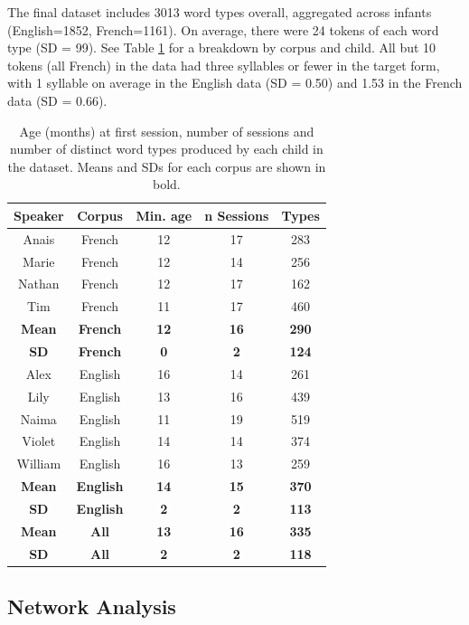 \documentclass[
  man,mask,floatsintext]{apa6}
\begin{document}
The final dataset includes 3013 word types overall, aggregated across infants (English=1852, French=1161). On average, there were 24 tokens of each word type (SD = 99). See Table \ref{tab:table-data-overview} for a breakdown by corpus and child. All but 10 tokens (all French) in the data had three syllables or fewer in the target form, with 1 syllable on average in the English data (SD = 0.50) and 1.53 in the French data (SD = 0.66).

\begin{longtable}[t]{ccccc}
\caption{\label{tab:table-data-overview}Age (months) at first session, number of sessions and number of distinct word types produced by each child in the dataset. Means and SDs for each corpus are shown in bold.}\\
\toprule
Speaker & Corpus & Min. age & n Sessions & Types\\
\midrule
Anais & French & 12 & 17 & 283\\
Marie & French & 12 & 14 & 256\\
Nathan & French & 12 & 17 & 162\\
Tim & French & 11 & 17 & 460\\
\midrule
\textbf{Mean} & \textbf{French} & \textbf{12} & \textbf{16} & \textbf{290}\\
\addlinespace
\textbf{SD} & \textbf{French} & \textbf{0} & \textbf{2} & \textbf{124}\\
\midrule
Alex & English & 16 & 14 & 261\\
Lily & English & 13 & 16 & 439\\
Naima & English & 11 & 19 & 519\\
Violet & English & 14 & 14 & 374\\
\addlinespace
William & English & 16 & 13 & 259\\
\midrule
\textbf{Mean} & \textbf{English} & \textbf{14} & \textbf{15} & \textbf{370}\\
\textbf{SD} & \textbf{English} & \textbf{2} & \textbf{2} & \textbf{113}\\
\midrule
\textbf{Mean} & \textbf{All} & \textbf{13} & \textbf{16} & \textbf{335}\\
\textbf{SD} & \textbf{All} & \textbf{2} & \textbf{2} & \textbf{118}\\
\bottomrule
\end{longtable}

\hypertarget{network-analysis}{%
\subsection{Network Analysis}\label{network-analysis}}
\end{document}
